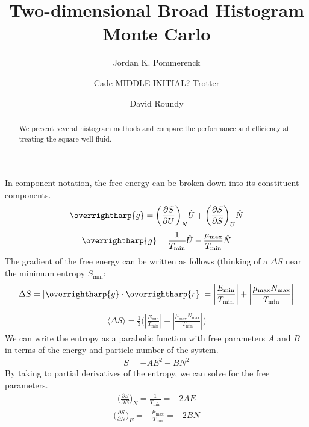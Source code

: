 \documentclass[letterpaper,twocolumn,amsmath,amssymb,pre,aps,10pt]{revtex4-1}
\begin{document}
\title{Two-dimensional Broad Histogram Monte Carlo}

\author{Jordan K. Pommerenck}
\author{Cade MIDDLE INITIAL? Trotter}
\author{David Roundy}

\begin{abstract}
We present several histogram methods and compare the performance and
efficiency at treating the square-well fluid.
\end{abstract}

\maketitle

In component notation, the free energy can be broken down into its constituent components.
\begin{align}
\overrightharp{g} = \bigg(\frac{\partial S}{\partial U}\bigg)_N \hat{U} + \bigg(\frac{\partial S}{\partial S}\bigg)_U \hat{N}
\end{align}
\begin{align}
\overrightharp{g} = \frac{1}{T_{\min}} \hat{U} - \frac{\mu_{\max}}{T_{\min}}  \hat{N}
\end{align}
The gradient of the free energy can be written as follows (thinking of a $\Delta S$ near the minimum entropy $S_{\min}$:
\begin{align}
\Delta S = \left|\overrightharp{g} \cdot \overrightharp{r} \right| = \left|\frac{E_{\min}}{T_{\min}} \right| + \left|\frac{\mu_{\max}N_{\max}}{T_{\min}} \right|
\end{align}
\begin{align}
\langle\Delta S \rangle = \frac{1}{3}\bigg( \left|\frac{E_{\min}}{T_{\min}} \right| + \left|\frac{\mu_{\max}N_{\max}}{T_{\min}} \right| \bigg)
\end{align}
We can write the entropy as a parabolic function with free parameters $A$ and $B$ in terms of the energy and particle number of the
system.
\begin{align}
S = -A E^2 - B N^2
\end{align}
By taking to partial derivatives of the entropy, we can solve for the free parameters.
\begin{align}
\bigg(\frac{\partial S}{\partial E}\bigg)_N = \frac{1}{T_{\min}} = - 2AE
\end{align}
\begin{align}
\bigg(\frac{\partial S}{\partial N}\bigg)_E = - \frac{\mu_{\max}}{T_{\min}} = - 2BN
\end{align}
\end{document}
